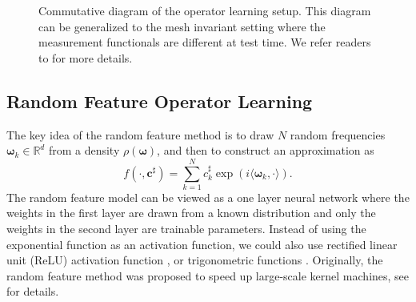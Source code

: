 \documentclass[11pt,twoside]{article}
\theoremstyle{plain}
\theoremstyle{definition}
\theoremstyle{remark}
\newcommand{\R}{\mathbb{R}}
\newcommand{\cb}{\mathbf{c}}
\newcommand{\Uc}{\mathcal{U}}
\newcommand{\Vc}{\mathcal{V}}
\newcommand{\omegab}{\boldsymbol\omega}
\begin{document}
\begin{figure}[!htbp]
\centering
{}
\caption{Commutative diagram of the operator learning setup. This diagram can be generalized to the mesh invariant setting where the measurement functionals are different at test time. We refer readers to \cite[Figure 3]{BATLLE2024kernel} for more details.}
\label{fig:diagram}
\end{figure}

\subsection{Random Feature Operator Learning}
The key idea of the random feature method is to draw $N$ random frequencies $\omegab_k\in\R^d$ from a density $\rho(\omegab)$, and then to construct an approximation as
\begin{equation}
\label{RF_model}
f(\cdot,\cb^\sharp) = \sum_{k=1}^N c_k^\sharp \exp \left(i\langle \omegab_k,\cdot\rangle\right).
\end{equation}
The random feature model can be viewed as a one layer neural network where the weights in the first layer are drawn from a known distribution and only the weights in the second layer are trainable parameters. Instead of using the exponential function as an activation function, we could also use rectified linear unit (ReLU) activation function \cite{Hsu2021reluRF}, or trigonometric functions \cite{HASHEMI2023generalization}. Originally, the random feature method was proposed to speed up large-scale kernel machines, see \cite{Rahimi2007RFM, Liu2022RandomFF} for details. 
\end{document}
